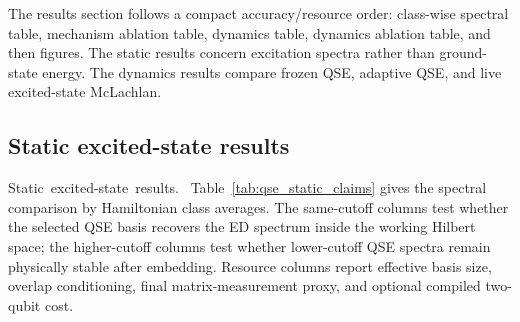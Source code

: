 \documentclass[
  reprint,
  amsmath,
  amssymb,
  aps,
  pra,
  nofootinbib,
  superscriptaddress,
  floatfix
]{revtex4-2}
\newcommand{\tentative}[1]{\textcolor{red!70!black}{#1}}
\newcommand{\structlabel}[1]{\noindent\mbox{\tentative{#1.}}~}
\begin{document}
The results section follows a compact accuracy/resource order: class-wise spectral table, mechanism ablation table, dynamics table, dynamics ablation table, and then figures.  The static results concern excitation spectra rather than ground-state energy.  The dynamics results compare frozen QSE, adaptive QSE, and live excited-state McLachlan.

\subsection{Static excited-state results}

\structlabel{Static excited-state results}
Table~\ref{tab:qse_static_claims} gives the spectral comparison by Hamiltonian class averages.  The same-cutoff columns test whether the selected QSE basis recovers the ED spectrum inside the working Hilbert space; the higher-cutoff columns test whether lower-cutoff QSE spectra remain physically stable after embedding.  Resource columns report effective basis size, overlap conditioning, final matrix-measurement proxy, and optional compiled two-qubit cost.
\end{document}
